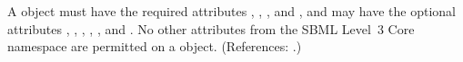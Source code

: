 A \Species object must have the required attributes ,
, ,
 and , and may have the optional
attributes , , ,
, , 
and .  No other attributes from the SBML Level~3
Core namespace are permitted on a \Species object.  (References: .)
